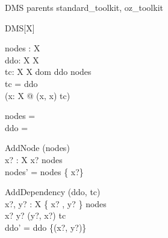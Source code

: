 \zsection DMS parents standard\_toolkit, oz\_toolkit\\

\begin{class}{DMS}[X]

\begin{state}
  nodes : \finset X\\
  ddo: X \rel X\\
  tc:  X \rel X  
\where
  dom ddo \subseteq nodes \\ 
  tc = ddo \star \\
  \lnot (\exists x:  X @ (x, x) \in tc)
\end{state}

\begin{init}
  nodes = \emptyset \\
  ddo = \emptyset
\end{init}

\begin{schema}{AddNode}
  \Delta (nodes)\\
  x? : X
\where
  x? \notin nodes\\ 
  nodes' = nodes \cup \{ x?\} 
\end{schema}

\begin{schema}{AddDependency}
  \Delta (ddo, tc)\\
  x?, y? : X
\where
  \{ x? , y? \} \notin nodes\\
  x? \neq y? \land (y?, x?) \notin tc \\ 
  ddo' = ddo \cup \{(x?, y?)\}
\end{schema}

\end{class}
